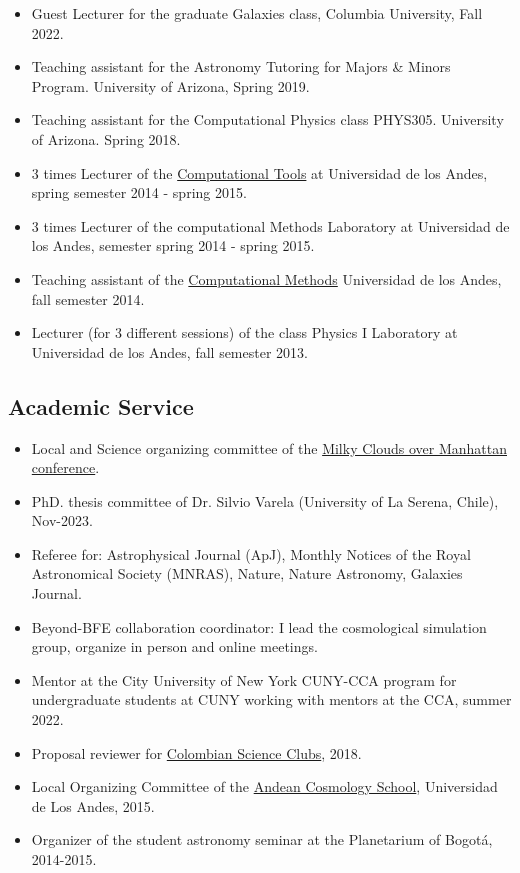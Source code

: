 \documentclass[UTF8]{article}
\begin{document}
\begin{itemize}
  \setlength\itemsep{0.0em}
  \renewcommand\labelitemi{$\cdot$}
\item Guest Lecturer for the graduate Galaxies class, Columbia University, Fall 2022.
\item Teaching assistant for the Astronomy Tutoring for Majors \& Minors Program. University of Arizona, Spring 2019. 
\item Teaching assistant for the Computational Physics class  PHYS305. University of Arizona. Spring 2018.
\item 3 times Lecturer of the \href{https://github.com/ComputoCienciasUniandes/HerramientasComputacionales}{Computational
  Tools} at Universidad de los Andes, spring semester 2014 - spring 2015.
\item 3 times Lecturer of the computational Methods Laboratory at Universidad de los Andes, semester spring 2014 -  spring 2015.
\item Teaching assistant of the
  \href{https://github.com/ComputoCienciasUniandes/MetodosComputacionales}{Computational
  Methods} Universidad de los Andes, fall  semester 2014.
\item Lecturer (for 3 different sessions) of the class Physics I Laboratory at Universidad de los Andes, fall semester 2013.
\end{itemize}


\subsection*{Academic Service} 

\begin{itemize}
  \setlength\itemsep{0.0em}
  \renewcommand\labelitemi{$\cdot$}
\item Local and Science organizing committee of the \href{https://events.simonsfoundation.org/event/1f18ba51-d6da-414f-b492-9590f29ad048/summary}{Milky Clouds over Manhattan conference}. 
\item PhD. thesis committee of Dr. Silvio Varela (University of La Serena, Chile), Nov-2023. 
\item Referee for: Astrophysical Journal (ApJ), Monthly Notices of the Royal  Astronomical Society (MNRAS), Nature, Nature Astronomy, Galaxies Journal.
\item Beyond-BFE collaboration coordinator: I lead the cosmological simulation group, organize in person and online meetings.
\item Mentor at the City University of New York CUNY-CCA program for undergraduate students at CUNY working with mentors at the CCA, summer 2022. 
\item Proposal reviewer for \href{https://clubesdeciencia.co/}{Colombian Science Clubs}, 2018.
\item Local Organizing Committee of the \href{http://forero.github.io/AndeanCosmologySchool/}{Andean Cosmology School}, Universidad de Los Andes, 2015.
\item Organizer of the student astronomy seminar at the Planetarium of Bogot\'a, 2014-2015.
\end{itemize}
\end{document}
